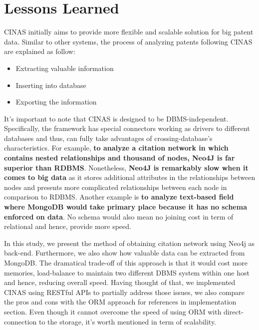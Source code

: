 \documentclass{article}
\begin{document}
\section{Lessons Learned}
CINAS initially aims to provide more flexible and scalable solution for big patent data. Similar to other systems, the process of analyzing patents following CINAS are explained as follow:

\begin{itemize}
\item Extracting valuable information
\item Inserting into database
\item Exporting the information
\end{itemize}

It's important to note that CINAS is designed to be DBMS-independent. Specifically, the framework has special connectors working as drivers to different databases and thus, can fully take advantages of crossing-database's characteristics. For example, \textbf{to analyze a citation network in which contains nested relationships and thousand of nodes,  Neo4J is far superior than RDBMS}. Nonetheless, \textbf{Neo4J is remarkably slow when it comes to big data} as it stores additional attributes in the relationships between nodes and presents more complicated relationships between each node in comparison to RDBMS. Another example is \textbf{to analyze text-based field where MongoDB would take primary place because it has no schema enforced on data}. No schema would also mean no joining cost in term of relational and hence, provide more speed. 

In this study, we present the method of obtaining citation network using Neo4j as back-end. Furthermore, we also show how valuable data can be extracted from MongoDB. The dramatical trade-off of this approach is that it would cost more memories, load-balance to maintain two different DBMS system within one host and hence, reducing overall speed. Having thought of that, we implemented CINAS using RESTful APIs to partially address those issues, we also compare the pros and cons with the ORM approach for references in implementation section. Even though it cannot overcome the speed of using ORM with direct-connection to the storage, it's worth mentioned in term of scalability.
\end{document}
